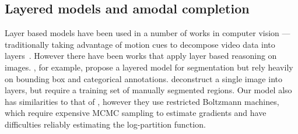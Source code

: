 \subsection{Layered models and amodal completion}
Layer based models have been used in a number of works in computer vision  --- traditionally
taking advantage of motion cues to decompose video data into layers~\citep{wang1994representing,ayer1995layered,kannan2005generative}.
However there have been works that apply layer based reasoning on images.
\cite{yang2012layered}, for example, propose a layered model for
segmentation but rely heavily on bounding box and categorical
annotations.	
\cite{Isola2013} deconstruct a single image into layers, but require a
training set of manually segmented regions.
Our model also has similarities to that of \cite{le2011learning}, however  they use restricted Boltzmann machines, 
which require expensive MCMC sampling to estimate gradients and have difficulties reliably estimating the 
log-partition function.  %
	
	
	


	
	
	
		
	
	
	
	
	
	
	

